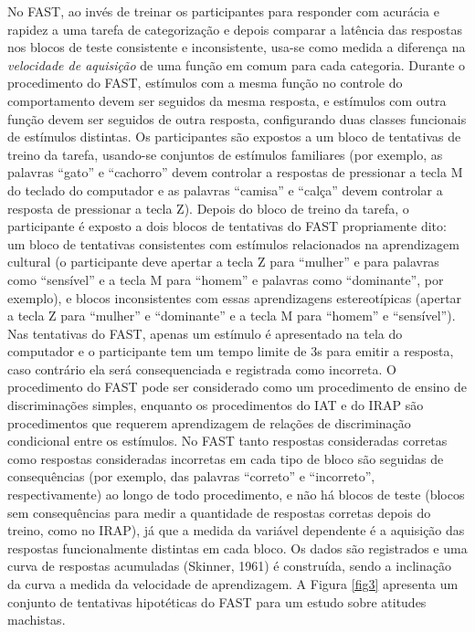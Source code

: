 No FAST, ao invés de treinar os participantes para responder com acurácia e rapidez a uma tarefa de categorização e depois comparar a latência das respostas nos blocos de teste consistente e inconsistente, usa-se como medida a diferença na \textit{velocidade de aquisição} de uma função em comum para cada categoria. Durante o procedimento do FAST, estímulos com a mesma função no controle do comportamento devem ser seguidos da mesma resposta, e estímulos com outra função devem ser seguidos de outra resposta, configurando duas classes funcionais de estímulos distintas. Os participantes são expostos a um bloco de tentativas de treino da tarefa, usando-se conjuntos de estímulos familiares (por exemplo, as palavras ``gato'' e ``cachorro'' devem controlar a respostas de pressionar a tecla M do teclado do computador e as palavras ``camisa'' e ``calça'' devem controlar a resposta de pressionar a tecla Z). Depois do bloco de treino da tarefa, o participante é exposto a dois blocos de tentativas do FAST propriamente dito: um bloco de tentativas consistentes com estímulos relacionados na aprendizagem cultural (o participante deve apertar a tecla Z para ``mulher'' e para palavras como ``sensível'' e a tecla M para ``homem'' e palavras como ``dominante'', por exemplo), e blocos inconsistentes com essas aprendizagens estereotípicas (apertar a tecla Z para ``mulher'' e ``dominante'' e a tecla M para ``homem'' e ``sensível''). Nas tentativas do FAST, apenas um estímulo é apresentado na tela do computador e o participante tem um tempo limite de 3s para emitir a resposta, caso contrário ela será consequenciada e registrada como incorreta. O procedimento do FAST pode ser considerado como um procedimento de ensino de discriminações simples, enquanto os procedimentos do IAT e do IRAP são procedimentos que requerem aprendizagem de relações de discriminação condicional entre os estímulos. No FAST tanto respostas consideradas corretas como respostas consideradas incorretas em cada tipo de bloco são seguidas de consequências (por exemplo, das palavras ``correto'' e ``incorreto'', respectivamente) ao longo de todo procedimento, e não há blocos de teste (blocos sem consequências para medir a quantidade de respostas corretas depois do treino, como no IRAP), já que a medida da variável dependente é a aquisição das respostas funcionalmente distintas em cada bloco. Os dados são registrados e uma curva de respostas acumuladas (Skinner, 1961) é construída, sendo a inclinação da curva a medida da velocidade de aprendizagem. A Figura \ref{fig3} apresenta um conjunto de tentativas hipotéticas do FAST para um estudo sobre atitudes machistas.

